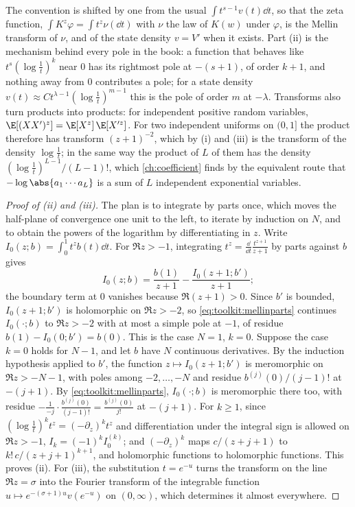 \begin{refsection}
The convention is shifted by one from the usual $\int t^{s-1}v(t)\dd t$, so that the zeta function, $\int K^z\varphi=\int t^z\nu(\dd t)$ with $\nu$ the law of $K(w)$ under $\varphi$, is the Mellin transform of $\nu$, and of the state density $v=V'$ when it exists. Part (ii) is the mechanism behind every pole in the book: a function that behaves like $t^s(\log\frac1t)^k$ near $0$ has its rightmost pole at $-(s+1)$, of order $k+1$, and nothing away from $0$ contributes a pole; for a state density $v(t)\approx Ct^{\lambda-1}(\log\frac1t)^{m-1}$ this is the pole of order $m$ at $-\lambda$. Transforms also turn products into products: for independent positive random variables, $\E[(XX')^z]=\E[X^z]\,\E[X'^z]$. For two independent uniforms on $(0,1]$ the product therefore has transform $(z+1)^{-2}$, which by (i) and (iii) is the transform of the density $\log\frac1t$; in the same way the product of $L$ of them has the density $(\log\frac1t)^{L-1}/(L-1)!$, which \cref{ch:coefficient} finds by the equivalent route that $-\log\abs{a_1\cdots a_L}$ is a sum of $L$ independent exponential variables.

\begin{proof}[Proof of (ii) and (iii)]
The plan is to integrate by parts once, which moves the half-plane of convergence one unit to the left, to iterate by induction on $N$, and to obtain the powers of the logarithm by differentiating in $z$. Write $I_0(z;b)=\int_0^1t^zb(t)\dd t$. For $\Re z>-1$, integrating $t^z=\frac{\dd}{\dd t}\frac{t^{z+1}}{z+1}$ by parts against $b$ gives
\begin{equation}\label{eq:toolkit:mellinparts}
I_0(z;b)=\frac{b(1)}{z+1}-\frac{I_0(z+1;b')}{z+1};
\end{equation}
the boundary term at $0$ vanishes because $\Re(z+1)>0$. Since $b'$ is bounded, $I_0(z+1;b')$ is holomorphic on $\Re z>-2$, so \eqref{eq:toolkit:mellinparts} continues $I_0(\cdot;b)$ to $\Re z>-2$ with at most a simple pole at $-1$, of residue $b(1)-I_0(0;b')=b(0)$. This is the case $N=1$, $k=0$. Suppose the case $k=0$ holds for $N-1$, and let $b$ have $N$ continuous derivatives. By the induction hypothesis applied to $b'$, the function $z\mapsto I_0(z+1;b')$ is meromorphic on $\Re z>-N-1$, with poles among $-2,\dots,-N$ and residue $b^{(j)}(0)/(j-1)!$ at $-(j+1)$. By \eqref{eq:toolkit:mellinparts}, $I_0(\cdot;b)$ is meromorphic there too, with residue $-\frac1{-j}\cdot\frac{b^{(j)}(0)}{(j-1)!}=\frac{b^{(j)}(0)}{j!}$ at $-(j+1)$. For $k\ge1$, since $(\log\frac1t)^kt^z=(-\partial_z)^kt^z$ and differentiation under the integral sign is allowed on $\Re z>-1$, $I_k=(-1)^kI_0^{(k)}$; and $(-\partial_z)^k$ maps $c/(z+j+1)$ to $k!\,c/(z+j+1)^{k+1}$, and holomorphic functions to holomorphic functions. This proves (ii). For (iii), the substitution $t=e^{-u}$ turns the transform on the line $\Re z=\sigma$ into the Fourier transform of the integrable function $u\mapsto e^{-(\sigma+1)u}v(e^{-u})$ on $(0,\infty)$, which determines it almost everywhere.
\end{proof}


\end{refsection}
